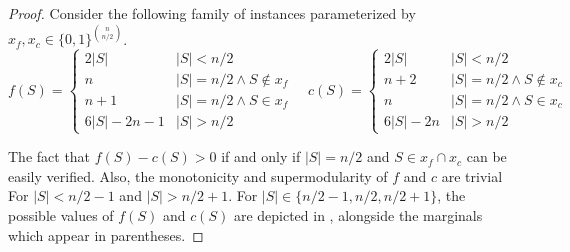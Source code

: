 \documentclass[11pt]{article}
\begin{document}
\begin{proof}
    Consider the following family of instances parameterized by $x_f,x_c \in \{0,1\}^{\binom{n}{n/2}}$.
\begin{equation}\label{eq:sup-sup}
f(S) = \begin{cases}
    2|S| & |S|<n/2 \\
    n & |S|=n/2 \land S \notin x_f\\
    n+1 & |S|=n/2 \land S \in x_f \\
    6|S|-2n-1 & |S|>n/2
\end{cases}
\quad
c(S) = \begin{cases}
    2|S| & |S|<n/2 \\
    n+2 & |S|=n/2 \land S \notin x_c\\
    n & |S|=n/2 \land S \in x_c \\
    6|S|-2n & |S|>n/2
\end{cases}    
\end{equation}

The fact that $f(S) - c(S) > 0$ if and only if $|S|=n/2$ and $S \in x_f \cap x_c$ can be easily verified. Also, the monotonicity and supermodularity of $f$ and $c$ are trivial For $|S| < n/2-1$ and $|S|>n/2+1$. For $|S|\in \{n/2-1,n/2,n/2+1\}$, the possible values of $f(S)$ and $c(S)$ are depicted in , alongside the marginals which appear in parentheses.
\end{proof}
\end{document}
